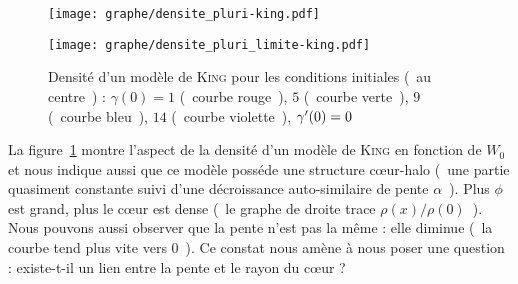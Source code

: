	\begin{figure}[ht!]
			\begin{minipage}[b]{0.40\linewidth}
				\centering \texttt{[image: graphe/densite\_pluri-king.pdf]}
			\end{minipage}\hfill
			\begin{minipage}[b]{0.48\linewidth}
				\centering \texttt{[image: graphe/densite\_pluri\_limite-king.pdf]}
			\end{minipage}
			\caption{Densité d'un modèle de \textsc{King} pour les conditions initiales
			(~au centre~) : $\gamma(0) = 1$ (~courbe rouge~), $5$ (~courbe verte~), $9$ (~courbe bleu~), $14$ (~courbe violette~), $\gamma'(0) = 0$}
			\label{King_Modele-test}
	\end{figure}

	La figure~\ref{King_Modele-test} montre l'aspect de la densité d'un modèle de \textsc{King} en fonction de $W_0$ et nous indique aussi que ce modèle posséde une structure cœur-halo
	(~une partie quasiment constante suivi d'une décroissance auto-similaire de pente $\alpha$~).
	Plus $\phi$ est grand, plus le cœur est dense (~le graphe de droite trace $\rho(x)/\rho(0)$~). Nous pouvons aussi observer que la pente n'est pas la même :
	elle diminue (~la courbe tend plus vite vers $0$~). Ce constat nous amène à nous poser une question : existe-t-il un
	lien entre la pente et le rayon du cœur ?
	\FloatBarrier
